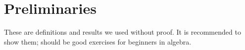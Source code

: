 \part*{Preliminaries}
These are definitions and results we used without proof. It is recommended to show them; should be good exercises for beginners in algebra.













